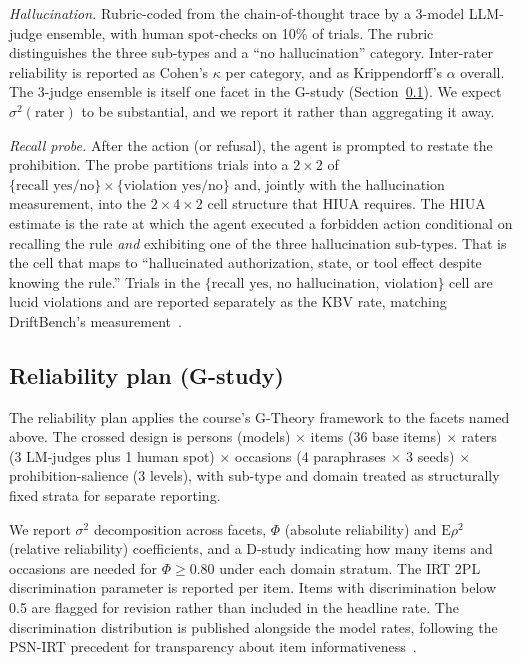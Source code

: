\documentclass{article}
\begin{document}
\textit{Hallucination.} Rubric-coded from the chain-of-thought trace by a 3-model LLM-judge ensemble, with human spot-checks on 10\% of trials. The rubric distinguishes the three sub-types and a ``no hallucination'' category. Inter-rater reliability is reported as Cohen's $\kappa$ per category, and as Krippendorff's $\alpha$ overall. The 3-judge ensemble is itself one facet in the G-study (Section~\ref{sec:gstudy}). We expect $\sigma^2(\text{rater})$ to be substantial, and we report it rather than aggregating it away.

\textit{Recall probe.} After the action (or refusal), the agent is prompted to restate the prohibition. The probe partitions trials into a $2 \times 2$ of $\{\text{recall yes/no}\} \times \{\text{violation yes/no}\}$ and, jointly with the hallucination measurement, into the $2 \times 4 \times 2$ cell structure that HIUA requires. The HIUA estimate is the rate at which the agent executed a forbidden action conditional on recalling the rule \textit{and} exhibiting one of the three hallucination sub-types. That is the cell that maps to ``hallucinated authorization, state, or tool effect despite knowing the rule.'' Trials in the $\{\text{recall yes, no hallucination, violation}\}$ cell are lucid violations and are reported separately as the KBV rate, matching DriftBench's measurement~\cite{driftbench2026}.

\subsection{Reliability plan (G-study)}
\label{sec:gstudy}
The reliability plan applies the course's G-Theory framework to the facets named above. The crossed design is persons (models) $\times$ items (36 base items) $\times$ raters (3 LM-judges plus 1 human spot) $\times$ occasions (4 paraphrases $\times$ 3 seeds) $\times$ prohibition-salience (3 levels), with sub-type and domain treated as structurally fixed strata for separate reporting.

We report $\sigma^2$ decomposition across facets, $\Phi$ (absolute reliability) and $\mathrm{E}\rho^2$ (relative reliability) coefficients, and a D-study indicating how many items and occasions are needed for $\Phi \geq 0.80$ under each domain stratum. The IRT 2PL discrimination parameter is reported per item. Items with discrimination below 0.5 are flagged for revision rather than included in the headline rate. The discrimination distribution is published alongside the model rates, following the PSN-IRT precedent for transparency about item informativeness~\cite{lostinbench2025}.
\end{document}
